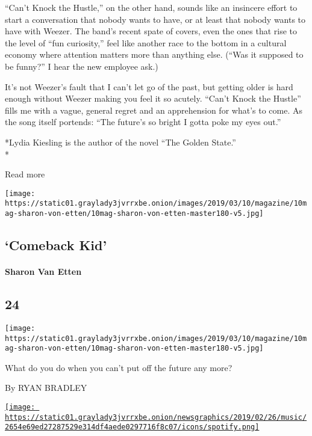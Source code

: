 ``Can't Knock the Hustle,'' on the other hand, sounds like an insincere
effort to start a conversation that nobody wants to have, or at least
that nobody wants to have with Weezer. The band's recent spate of
covers, even the ones that rise to the level of ``fun curiosity,'' feel
like another race to the bottom in a cultural economy where attention
matters more than anything else. (``Was it supposed to be funny?'' I
hear the new employee ask.)

It's not Weezer's fault that I can't let go of the past, but getting
older is hard enough without Weezer making you feel it so acutely.
``Can't Knock the Hustle'' fills me with a vague, general regret and an
apprehension for what's to come. As the song itself portends: ``The
future's so bright I gotta poke my eyes out.''

*Lydia Kiesling is the author of the novel ``The Golden State.''\\
*

Read more

\texttt{[image: https://static01.graylady3jvrrxbe.onion/images/2019/03/10/magazine/10mag-sharon-von-etten/10mag-sharon-von-etten-master180-v5.jpg]}

\hypertarget{--comeback-kid}{%
\subsection{\texorpdfstring{ `Comeback
Kid'}{  `Comeback Kid'}}\label{--comeback-kid}}

\hypertarget{sharon-van-etten}{%
\paragraph{Sharon Van Etten}\label{sharon-van-etten}}

\hypertarget{24}{%
\subsection{24}\label{24}}

\texttt{[image: https://static01.graylady3jvrrxbe.onion/images/2019/03/10/magazine/10mag-sharon-von-etten/10mag-sharon-von-etten-master180-v5.jpg]}

What do you do when you can't put off the future any more?

By RYAN BRADLEY

\href{https://open.spotify.com/track/5nUVtL9EgUDCsjZT2Hcy9H}{\texttt{[image: https://static01.graylady3jvrrxbe.onion/newsgraphics/2019/02/26/music/2654e69ed27287529e314df4aede0297716f8c07/icons/spotify.png]}}

